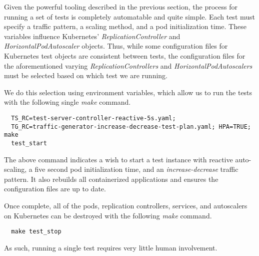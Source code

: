 Given the powerful tooling described in the previous section, the process for
running a set of tests is completely automatable and quite simple. Each test
must specify a traffic pattern, a scaling method, and a pod initialization time.
These variables influence Kubernetes' \textit{ReplicationController} and
\textit{HorizontalPodAutoscaler} objects. Thus, while some configuration files
for Kubernetes test objects are consistent between tests, the configuration
files for the aforementioned varying \textit{ReplicationControllers} and
\textit{HorizontalPodAutoscalers} must be selected based on which test we are
running.

We do this selection using environment variables, which allow us to run the
tests with the following single \textit{make} command.

\begin{verbatim}
  TS_RC=test-server-controller-reactive-5s.yaml;
  TG_RC=traffic-generator-increase-decrease-test-plan.yaml; HPA=TRUE; make
  test_start
\end{verbatim}

The above command indicates a wish to start a test instance with reactive
auto-scaling, a five second pod initialization time, and an
\textit{increase-decrease} traffic pattern. It also rebuilds all containerized
applications and ensures the configuration files are up to date.

Once complete, all of the pods, replication controllers, services, and
autoscalers on Kubernetes can be destroyed with the following \textit{make}
command.

\begin{verbatim}
  make test_stop
\end{verbatim}

As such, running a single test requires very little human involvement.
